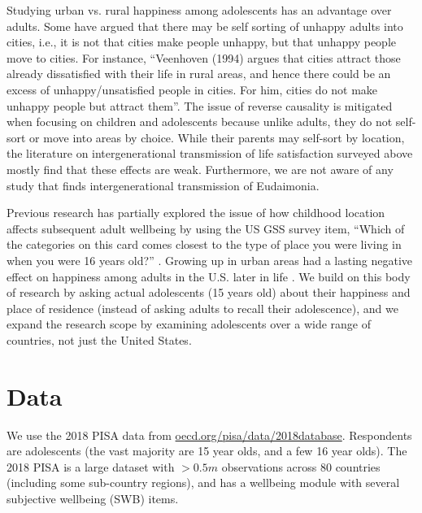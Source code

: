 \documentclass[10pt, letterpaper]{article}
\begin{document}
\begin{spacing}{1.4}
Studying urban vs. rural happiness among  adolescents has an advantage over adults. Some have argued that there may be self sorting of unhappy adults into cities, i.e., it is not that cities make people unhappy, but that unhappy people move to cities. For instance, ``Veenhoven (1994) argues that cities attract
those already dissatisfied with their life in rural areas, and hence there could
be an excess of unhappy/unsatisfied people in cities. For him, cities do not
make unhappy people but attract them''\citep[cited in][]{ebshoy24}. The issue of
reverse causality is mitigated when focusing on children and adolescents because
unlike adults, they do not self-sort or move into areas by
choice. 
 While their parents may self-sort by location, the literature on
 intergenerational transmission of life satisfaction surveyed above
 \citep[e.g.,][]{bedin2014dyadic,casas2008does, casas2012testing}  mostly find that these effects
are weak. Furthermore, we are not aware of any study that finds
intergenerational transmission of Eudaimonia.

Previous research has partially explored the issue of how childhood location affects subsequent adult wellbeing by using the US GSS survey item,
``Which of the categories on this card comes closest to the type of place you
were living in when you were 16 years old?'' \citep{aok20}. Growing up in urban
areas had a lasting negative effect on happiness among adults in the U.S. later
in life \citep{aok20}. We build on this body of research by asking actual
adolescents (15 years old) about their happiness and place of residence (instead
of asking adults to recall their adolescence), and we expand the research scope
by examining adolescents  over a wide range of countries, not just the United States. 


\section*{Data}

We use the 2018 PISA data %
 from \url{oecd.org/pisa/data/2018database}. Respondents are adolescents (the vast majority are 15 year olds, and a few 16 year olds).
The 2018 PISA is a large dataset with $>0.5m$ observations across 80 %
countries (including some sub-country regions), %
 and  has a wellbeing module with several subjective wellbeing (SWB) items. 


\end{spacing}
\end{document}
